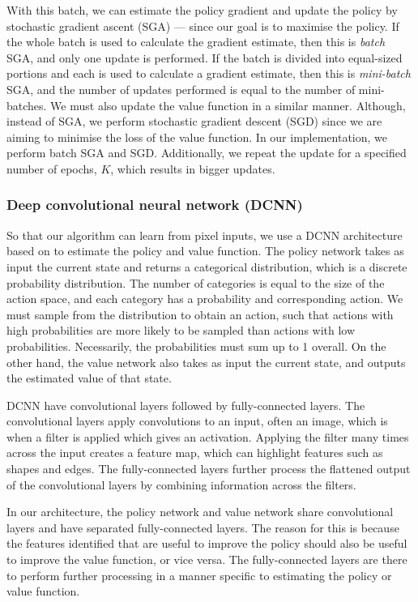 \documentclass[12pt,a4paper]{article}
\begin{document}
With this batch, we can estimate the policy gradient and update the policy by stochastic gradient ascent (SGA) --- since our goal is to maximise the policy. If the whole batch is used to calculate the gradient estimate, then this is \emph{batch} SGA, and only one update is performed. If the batch is divided into equal-sized portions and each is used to calculate a gradient estimate, then this is \emph{mini-batch} SGA, and the number of updates performed is equal to the number of mini-batches. We must also update the value function in a similar manner. Although, instead of SGA, we perform stochastic gradient descent (SGD) since we are aiming to minimise the loss of the value function. In our implementation, we perform batch SGA and SGD. Additionally, we repeat the update for a specified number of epochs, $K$, which results in bigger updates.

\subsubsection{Deep convolutional neural network (DCNN)}
So that our algorithm can learn from pixel inputs, we use a DCNN architecture based on \cite{Mnih2015} to estimate the policy and value function. The policy network takes as input the current state and returns a categorical distribution, which is a discrete probability distribution. The number of categories is equal to the size of the action space, and each category has a probability and corresponding action. We must sample from the distribution to obtain an action, such that actions with high probabilities are more likely to be sampled than actions with low probabilities. Necessarily, the probabilities must sum up to 1 overall. On the other hand, the value network also takes as input the current state, and outputs the estimated value of that state. 

DCNN have convolutional layers followed by fully-connected layers. The convolutional layers apply convolutions to an input, often an image, which is when a filter is applied which gives an activation. Applying the filter many times across the input creates a feature map, which can highlight features such as shapes and edges. The fully-connected layers further process the flattened output of the convolutional layers by combining information across the filters.

In our architecture, the policy network and value network share convolutional layers and have separated fully-connected layers. The reason for this is because the features identified that are useful to improve the policy should also be useful to improve the value function, or vice versa. The fully-connected layers are there to perform further processing in a manner specific to estimating the policy or value function. 
\end{document}
